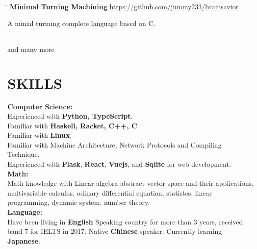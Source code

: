 \documentclass{res}
\begin{document}
\begin{resume}
    \vspace{-0.2in}
    \begin{tabbing}
        \hspace{2.3in}\= \hspace{0.3in}\= \kill
        {\bf Minimal Turning Machining} \>               \>\url{https://github.com/jummy233/brainsavior}\\
    \end{tabbing}\vspace{-33pt}
    A minial turining complete language based on C.

    \vspace{-0.01in}\\
    and many more

\section{SKILLS}
    \textbf{Computer Science:}
    \vspace{0.05in}\\
    {\large E}xperienced with \textbf{Python, TypeScript}. \\
    {\large F}amiliar with \textbf{Haskell, Racket, C++, C}. \\
    {\large F}amiliar with \textbf{Linux}. \\
    {\large F}amiliar with Machine Architecture, Network
    Protocols and Compiling Technique. \\
    {\large E}xperienced with \textbf{Flask}, \textbf{React}, \textbf{Vuejs}, and \textbf{Sqlite} for web development. \\
    \textbf{Math:}
    \vspace{0.05in}\\
    {\large M}ath knowledge with Linear algebra abstract vector space and their applications, multivariable calculus, odinary differential equation, statistcs, linear programming, dynamic system, number theory. \\
    \textbf{Language:}
    \vspace{0.05in}\\
    Have been living in \textbf{English} Speaking country for more than 3 years, received band 7 for IELTS in 2017. Native \textbf{Chinese} speaker. Currently learning
    \textbf{Japanese}.


\end{resume}
\end{document}
